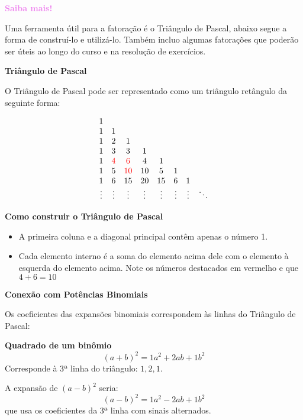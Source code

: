 \documentclass[12pt,openright,twoside,a4paper]{article}
\theoremstyle{definition}
\begin{document}
	\begin{snugshade}
		\textbf{\textcolor{violet}{Saiba mais!}}
		
		Uma ferramenta útil para a fatoração é o Triângulo de Pascal, abaixo segue a forma de construí-lo e utilizá-lo. Também incluo algumas fatorações que poderão ser úteis ao longo do curso e na resolução de exercícios.
		
		\textbf{\large{Triângulo de Pascal}}
		
		O Triângulo de Pascal pode ser representado como um triângulo retângulo da seguinte forma:
		
		\[
		\begin{array}{cccccccc}
			1 &   &   &   &   &   &   & \\
			1 & 1 &   &   &   &   &   & \\
			1 & 2 & 1 &   &   &   &   & \\
			1 & 3 & 3 & 1 &   &   &   & \\
			1 & \textcolor{red}{4} & \textcolor{red}{6} & 4 & 1 &   &   & \\
			1 & 5 & \textcolor{red}{10} & 10 & 5 & 1 &   & \\
			1 & 6 & 15 & 20 & 15 & 6 & 1 & \\
			\vdots & \vdots & \vdots & \vdots & \vdots & \vdots & \vdots & \ddots \\
		\end{array}
		\]
		
		\textbf{Como construir o Triângulo de Pascal}
		
		\begin{itemize}
			\item A primeira coluna e a diagonal principal contêm apenas o número 1.
			\item Cada elemento interno é a soma do elemento acima dele com o elemento à esquerda do elemento acima. Note os números destacados em vermelho e que $4 + 6 = 10$
		\end{itemize}
		
		\textbf{\large{Conexão com Potências Binomiais}}
		
		Os coeficientes das expansões binomiais correspondem às linhas do Triângulo de Pascal:
		
		\textbf{Quadrado de um binômio}
		\[ (a + b)^2 = \boxed{1}a^2 + \boxed{2}ab + \boxed{1}b^2 \]
		Corresponde à $3$ª linha do triângulo: $1, 2, 1$.
		
		A expansão de $(a - b)^2$ seria:
		\[ (a - b)^2 = 1a^2 - 2ab + 1b^2 \]
		que usa os coeficientes da 3ª linha com sinais alternados.
		

\end{snugshade}
\end{document}
